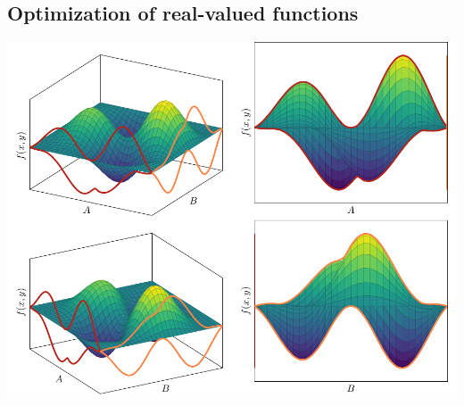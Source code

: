 \documentclass[10pt]{article}
\theoremstyle{definition}
\theoremstyle{remark}
\begin{document}
\subsection{Optimization of real-valued functions}
\begin{center}
    \includegraphics[]{figures/min_max_multivariate_function/figure.pdf}
\end{center}
\end{document}
